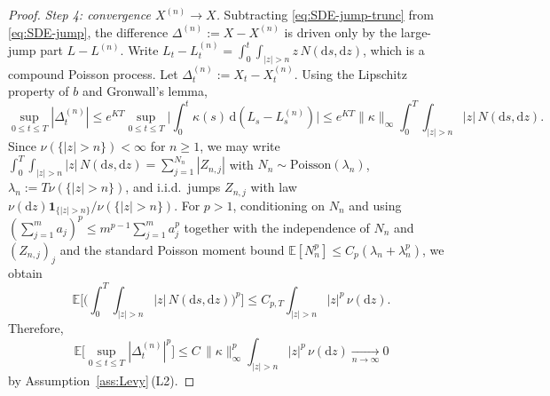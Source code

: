 \documentclass[11pt]{article}
\newcommand{\E}{\mathbb{E}}
\newcommand{\1}{\mathbf{1}}
\newcommand{\dd}{\mathrm{d}}
\theoremstyle{plain}
\theoremstyle{definition}
\theoremstyle{remark}
\begin{document}
\begin{proof}
\medskip
\noindent\emph{Step 4: convergence $X^{(n)}\to X$.}
Subtracting \eqref{eq:SDE-jump-trunc} from \eqref{eq:SDE-jump}, the difference $\Delta^{(n)}:=X-X^{(n)}$ is driven only by the large-jump part $L-L^{(n)}$.
Write $L_t-L^{(n)}_t=\int_0^t\int_{|z|>n} z\,N(\dd s,\dd z)$, which is a compound Poisson process.
Let $\Delta^{(n)}_t:=X_t-X^{(n)}_t$.
Using the Lipschitz property of $b$ and Gronwall's lemma,
\[
\sup_{0\le t\le T}|\Delta^{(n)}_t|
\le e^{KT}\sup_{0\le t\le T}\Big|\int_0^t\kappa(s)\,\dd(L_s-L^{(n)}_s)\Big|
\le e^{KT}\|\kappa\|_\infty\int_0^T\int_{|z|>n}|z|\,N(\dd s,\dd z).
\]
Since $\nu(\{|z|>n\})<\infty$ for $n\ge1$, we may write
$\int_0^T\int_{|z|>n}|z|\,N(\dd s,\dd z)=\sum_{j=1}^{N_n}|Z_{n,j}|$
with $N_n\sim\mathrm{Poisson}(\lambda_n)$, $\lambda_n:=T\nu(\{|z|>n\})$, and i.i.d.\ jumps $Z_{n,j}$ with law $\nu(\dd z)\1_{\{|z|>n\}}/\nu(\{|z|>n\})$.
For $p>1$, conditioning on $N_n$ and using $(\sum_{j=1}^m a_j)^p\le m^{p-1}\sum_{j=1}^m a_j^p$ together with the independence of $N_n$ and $(Z_{n,j})_j$ and the standard Poisson moment bound
$\E[N_n^p]\le C_p(\lambda_n+\lambda_n^p)$, we obtain
\[
\E\Big[\Big(\int_0^T\int_{|z|>n}|z|\,N(\dd s,\dd z)\Big)^p\Big]
\le C_{p,T}\int_{|z|>n}|z|^p\,\nu(\dd z).
\]
Therefore,
\[
\E\Big[\sup_{0\le t\le T}|\Delta^{(n)}_t|^p\Big]\le C\,\|\kappa\|_\infty^p\int_{|z|>n}|z|^p\,\nu(\dd z)\xrightarrow[n\to\infty]{}0
\]
by Assumption~\ref{ass:Levy}\,(L2).


\end{proof}
\end{document}
